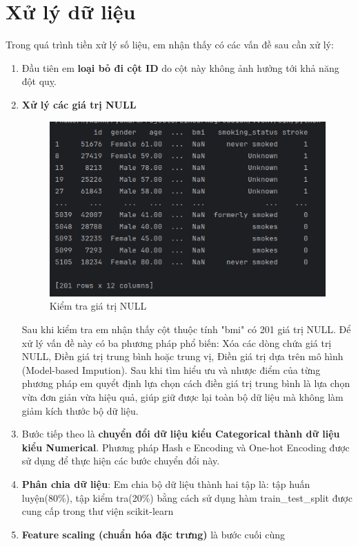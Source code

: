 \documentclass[11pt]{article}
\begin{document}
	\pagebreak
	
	\section{Xử lý dữ liệu}
	
	Trong quá trình tiền xử lý số liệu, em nhận thấy có các vấn đề sau cần xử lý:
	\begin{enumerate}
		\item Đầu tiên em \textbf{loại bỏ đi cột ID} do cột này không ảnh hưởng tới khả năng đột quỵ.
		\item
		\textbf{Xử lý các giá trị NULL}
		\begin{figure}[H]
			\centering
			\includegraphics[width=0.7\linewidth]{nullCheck}
			\caption{Kiểm tra giá trị NULL}
			\label{fig:nullcheck}
		\end{figure}
		Sau khi kiểm tra em nhận thấy cột thuộc tính "bmi" có 201 giá trị NULL. Để xử lý vấn đề này có ba phương pháp phổ biến: Xóa các dòng chứa giá trị NULL, Điền giá trị trung bình hoặc trung vị, Điền giá trị dựa trên mô hình (Model-based Impution).
		Sau khi tìm hiểu ưu và nhược điểm của từng phương pháp em quyểt định lựa chọn cách điền giá trị trung bình là lựa chọn vừa đơn giản vừa hiệu quả, giúp giữ được lại toàn bộ dữ liệu mà không làm giảm kích thước bộ dữ liệu.
		\item Bước tiếp theo là \textbf{chuyển đổi dữ liệu kiểu Categorical thành dữ liệu kiểu Numerical}. Phương pháp Hash e Encoding và One-hot Encoding được sử dụng để thực hiện các bước chuyển đổi này.
		\item \textbf{Phân chia dữ liệu}: Em chia bộ dữ liệu thành hai tập là: tập huấn luyện(80\%), tập kiểm tra(20\%) bằng cách sử dụng hàm train\_test\_split được cung cấp trong thư viện scikit-learn
		\item \textbf{Feature scaling (chuẩn hóa đặc trưng)} là bước cuối cùng
	\end{enumerate}
\end{document}
